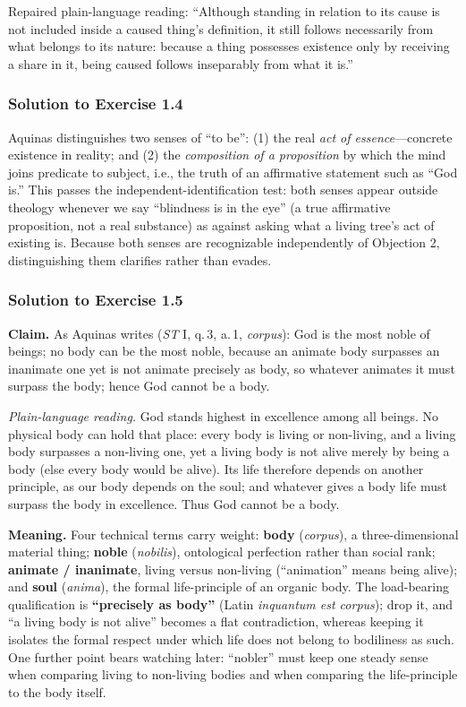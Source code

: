 Repaired plain-language reading: ``Although standing in relation to its cause is not included inside a caused thing's definition, it still follows necessarily from what belongs to its nature: because a thing possesses existence only by receiving a share in it, being caused follows inseparably from what it is.''

\subsubsection*{Solution to Exercise 1.4}
Aquinas distinguishes two senses of ``to be'': (1) the real \emph{act of essence}---concrete existence in reality; and (2) the \emph{composition of a proposition} by which the mind joins predicate to subject, i.e., the truth of an affirmative statement such as ``God is.'' This passes the independent-identification test: both senses appear outside theology whenever we say ``blindness is in the eye'' (a true affirmative proposition, not a real substance) as against asking what a living tree's act of existing is. Because both senses are recognizable independently of Objection 2, distinguishing them clarifies rather than evades.

\subsubsection*{Solution to Exercise 1.5}
\textbf{Claim.} As Aquinas writes (\emph{ST} I, q.\,3, a.\,1, \emph{corpus}): God is the most noble of beings; no body can be the most noble, because an animate body surpasses an inanimate one yet is not animate precisely as body, so whatever animates it must surpass the body; hence God cannot be a body.

\emph{Plain-language reading.} God stands highest in excellence among all beings. No physical body can hold that place: every body is living or non-living, and a living body surpasses a non-living one, yet a living body is not alive merely by being a body (else every body would be alive). Its life therefore depends on another principle, as our body depends on the soul; and whatever gives a body life must surpass the body in excellence. Thus God cannot be a body.

\textbf{Meaning.} Four technical terms carry weight: \textbf{body} (\emph{corpus}), a three-dimensional material thing; \textbf{noble} (\emph{nobilis}), ontological perfection rather than social rank; \textbf{animate / inanimate}, living versus non-living (``animation'' means being alive); and \textbf{soul} (\emph{anima}), the formal life-principle of an organic body. The load-bearing qualification is \textbf{``precisely as body''} (Latin \emph{inquantum est corpus}); drop it, and ``a living body is not alive'' becomes a flat contradiction, whereas keeping it isolates the formal respect under which life does not belong to bodiliness as such. One further point bears watching later: ``nobler'' must keep one steady sense when comparing living to non-living bodies and when comparing the life-principle to the body itself.
